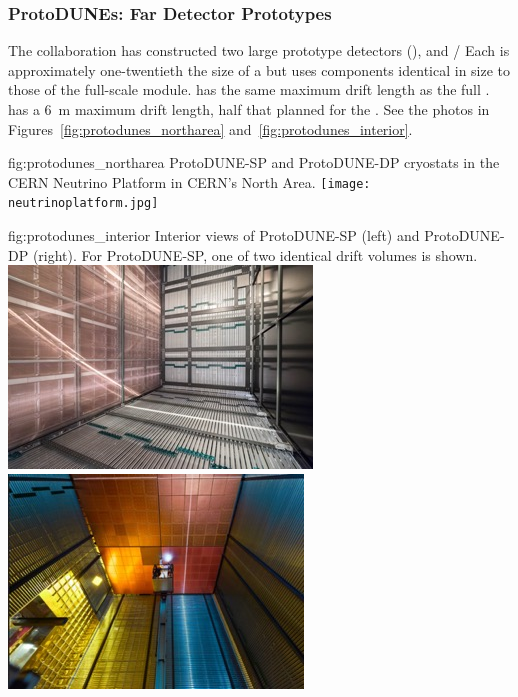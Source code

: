 \subsubsection{ProtoDUNEs: Far Detector Prototypes}

The  collaboration has constructed 
two large prototype detectors (),  and / %
 Each is approximately one-twentieth the size of a   but uses components identical in size to those of the full-scale module.  has the same \spmaxdrift maximum drift length as the full .  has a \SI{6}{m} maximum drift length, half that planned for the . See the photos in Figures~\ref{fig:protodunes_northarea} and~\ref{fig:protodunes_interior}.

\begin{dunefigure}
{fig:protodunes_northarea}
{ProtoDUNE-SP and ProtoDUNE-DP cryostats in the CERN Neutrino Platform in CERN's North Area.}
\texttt{[image: neutrinoplatform.jpg]}
\end{dunefigure}

\begin{dunefigure}
{fig:protodunes_interior}
{Interior views of ProtoDUNE-SP (left) and ProtoDUNE-DP (right). For ProtoDUNE-SP, one of two identical drift volumes is shown.}
\includegraphics[width=0.46\linewidth]{graphics/ProtoDUNE-sp-interior.jpg}\hspace{0.05\linewidth}
\includegraphics[width=0.44\linewidth]{graphics/protodune-dp-interior.jpg}
\end{dunefigure}


